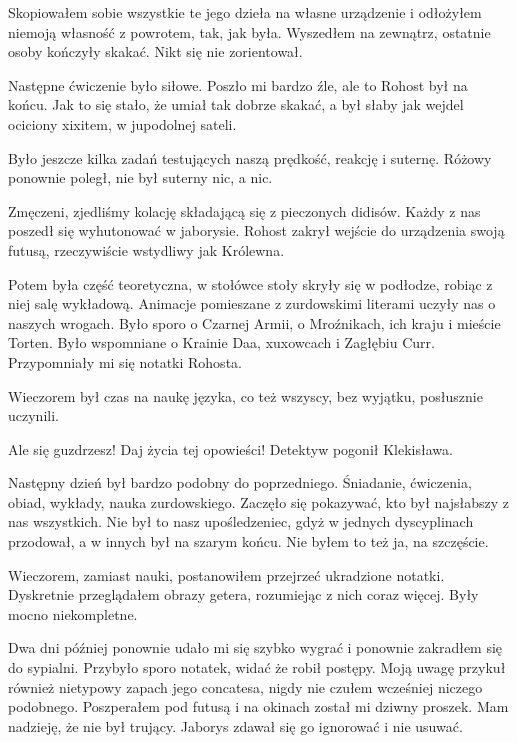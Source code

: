 Skopiowałem sobie wszystkie te jego dzieła na własne urządzenie i odłożyłem niemoją własność z powrotem, tak, jak była.
Wyszedłem na zewnątrz, ostatnie osoby kończyły skakać. Nikt się nie zorientował.

Następne ćwiczenie było siłowe. 
Poszło mi bardzo źle, ale to Rohost był na końcu.
Jak to się stało, że umiał tak dobrze skakać, a był słaby jak wejdel ociciony xixitem, w jupodolnej sateli.

Było jeszcze kilka zadań testujących naszą prędkość, reakcję i suternę.
Różowy ponownie poległ, nie był suterny nic, a nic.

Zmęczeni, zjedliśmy kolację składającą się z pieczonych didisów.
Każdy z nas poszedł się wyhutonować w jaborysie.
Rohost zakrył wejście do urządzenia swoją futusą, rzeczywiście wstydliwy jak Królewna.

Potem była część teoretyczna, w stołówce stoły skryły się w podłodze, robiąc z niej salę wykładową.
Animacje pomieszane z zurdowskimi literami uczyły nas o naszych wrogach.
Było sporo o Czarnej Armii, o Mroźnikach, ich kraju i mieście Torten. Było wspomniane o Krainie Daa, xuxowcach i Zagłębiu Curr.
Przypomniały mi się notatki Rohosta.

Wieczorem był czas na naukę języka, co też wszyscy, bez wyjątku, posłusznie uczynili.

\divider{}

\begin{dialogue}
\ds{} Ale się guzdrzesz! Daj życia tej opowieści! \dm{} Detektyw pogonił Klekisława.
\end{dialogue}

\divider{}

Następny dzień był bardzo podobny do poprzedniego.
Śniadanie, ćwiczenia, obiad, wykłady, nauka zurdowskiego.
Zaczęło się pokazywać, kto był najsłabszy z nas wszystkich.
Nie był to nasz upośledzeniec, gdyż w jednych dyscyplinach przodował, a w innych był na szarym końcu.
Nie byłem to też ja, na szczęście.

Wieczorem, zamiast nauki, postanowiłem przejrzeć ukradzione notatki.
Dyskretnie przeglądałem obrazy getera, rozumiejąc z nich coraz więcej.
Były mocno niekompletne.

Dwa dni później ponownie udało mi się szybko wygrać i ponownie zakradłem się do sypialni.
Przybyło sporo notatek, widać że robił postępy.
Moją uwagę przykuł również nietypowy zapach jego concatesa, nigdy nie czułem wcześniej niczego podobnego.
Poszperałem pod futusą i na okinach został mi dziwny proszek.
Mam nadzieję, że nie był trujący.
Jaborys zdawał się go ignorować i nie usuwać.

